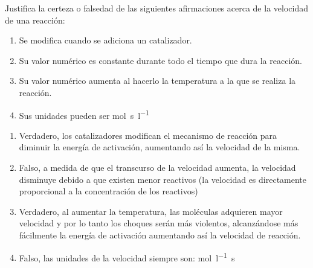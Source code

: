 \begin{exerciseEVAU}
     Justifica la certeza o falsedad de las siguientes afirmaciones acerca de la velocidad de una reacción:
    \begin{enumerate}[label=\letraminuscula]
        \item Se modifica cuando se adiciona un catalizador.
        \item Su valor numérico es constante durante todo el tiempo que dura la reacción.
        \item Su valor numérico aumenta al hacerlo la temperatura a la que se realiza la reacción.
        \item Sus unidades pueden ser \si{\mole\s\litre^{-1}}
    \end{enumerate}
    \begin{solu}

        \begin{enumerate}[label=\letraminuscula]
            \item Verdadero, los catalizadores modifican el mecanismo de reacción para diminuir la energía de activación, aumentando así la velocidad de la misma.
            \item Falso, a medida de que el transcurso de la velocidad aumenta, la velocidad disminuye debido a que existen menor reactivos (la velocidad es directamente proporcional a la concentración de los reactivos)
            \item Verdadero, al aumentar la temperatura, las moléculas adquieren mayor velocidad y por lo tanto los choques serán más violentos, alcanzándose más fácilmente la energía de activación aumentando así la velocidad de reacción.
            \item Falso, las unidades de la velocidad siempre son: \si{\mole\per\litre\s}
        \end{enumerate}

    \end{solu}

\end{exerciseEVAU}

